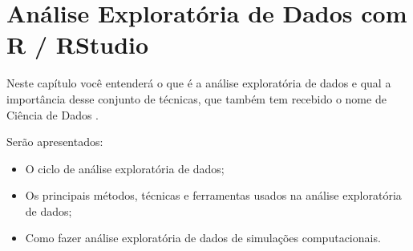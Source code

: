 \chapter{Análise Exploratória de Dados com R / RStudio}

Neste capítulo você entenderá o que é a análise exploratória de dados e qual a importância desse conjunto de técnicas, que também tem recebido o nome de Ciência de Dados \cite{wickham_r_2016}.

Serão apresentados:
\begin{itemize}
    \item O ciclo de análise exploratória de dados;
    \item Os principais métodos, técnicas e ferramentas usados na análise exploratória de dados;
    \item Como fazer análise exploratória de dados de simulações computacionais.
\end{itemize}
